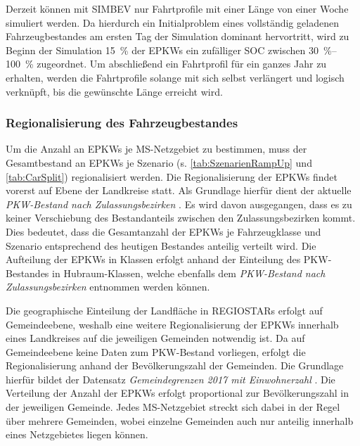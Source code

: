 Derzeit können mit \gls{SIMBEV} nur Fahrtprofile mit einer Länge von einer Woche simuliert werden.
Da hierdurch ein Initialproblem eines vollständig geladenen Fahrzeugbestandes am ersten Tag der Simulation dominant hervortritt, wird zu Beginn der Simulation \SI{15}{\percent} der \glspl{EPKW} ein zufälliger \gls{SOC} zwischen \SIrange[range-phrase=~bis~]{30}{100}{\percent} zugeordnet.
Um abschließend ein Fahrtprofil für ein ganzes Jahr zu erhalten, werden die Fahrtprofile solange mit sich selbst verlängert und logisch verknüpft, bis die gewünschte Länge erreicht wird.


\subsubsection{Regionalisierung des Fahrzeugbestandes}

Um die Anzahl an \glspl{EPKW} je \gls{MS}-Netzgebiet zu bestimmen, muss der Gesamtbestand an \glspl{EPKW} je Szenario (s. \autoref{tab:SzenarienRampUp} und \autoref{tab:CarSplit}) regionalisiert werden.
Die Regionalisierung der \glspl{EPKW} findet vorerst auf Ebene der Landkreise statt.
Als Grundlage hierfür dient der aktuelle \textit{PKW-Bestand nach Zulassungsbezirken} \cite[][Stand: ]{KBAPLZ2020}.
Es wird davon ausgegangen, dass es zu keiner Verschiebung des Bestandanteils zwischen den Zulassungsbezirken kommt.
Dies bedeutet, dass die Gesamtanzahl der \glspl{EPKW} je Fahrzeugklasse und Szenario entsprechend des heutigen Bestandes anteilig verteilt wird.
Die Aufteilung der \glspl{EPKW} in Klassen erfolgt anhand der Einteilung des \gls{PKW}-Bestandes in Hubraum-Klassen, welche ebenfalls dem \textit{PKW-Bestand nach Zulassungsbezirken} entnommen werden können.\medskip

Die geographische Einteilung der Landfläche in \glspl{REGIOSTAR} erfolgt auf Gemeindeebene, weshalb eine weitere Regionalisierung der \glspl{EPKW} innerhalb eines Landkreises auf die jeweiligen Gemeinden notwendig ist.
Da auf Gemeindeebene keine Daten zum \gls{PKW}-Bestand vorliegen, erfolgt die Regionalisierung anhand der Bevölkerungszahl der Gemeinden.
Die Grundlage hierfür bildet der Datensatz \textit{Gemeindegrenzen 2017 mit Einwohnerzahl} \cite[][Stand: ]{EDG2020}.
Die Verteilung der Anzahl der \glspl{EPKW} erfolgt proportional zur Bevölkerungszahl in der jeweiligen Gemeinde.
Jedes \gls{MS}-Netzgebiet streckt sich dabei in der Regel über mehrere Gemeinden, wobei einzelne Gemeinden auch nur anteilig innerhalb eines Netzgebietes liegen können.\medskip

